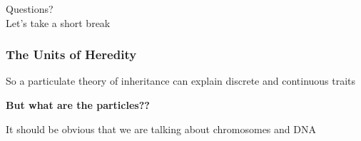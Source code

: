 \documentclass{beamer}
\begin{document}
\begin{frame}
	
	\Huge
	Questions? \\ \pause
	Let's take a short break
	
\end{frame}




\begin{frame}

	\frametitle{The Units of Heredity}
	
	So a particulate theory of inheritance can explain discrete and continuous traits\\
	\bigskip
	
	\textbf{But what are the particles??} \pause

\tiny It should be obvious that we are talking about chromosomes and DNA	
	
	
	
\end{frame}
\end{document}
